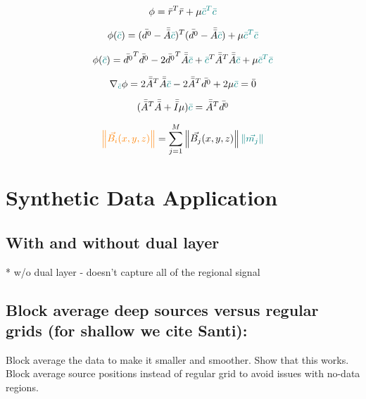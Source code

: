 \begin{equation}
    \phi = \bar{r}^T\bar{r} + \mu \textcolor{teal}{\bar{c}^T\bar{c}}
\end{equation}

\begin{equation}
    \phi (\textcolor{teal}{\bar{c}}) = (\bar{d^0} - \Bar{\Bar{A}} \textcolor{teal}{\Bar{c}})^T (\bar{d^0} - \Bar{\Bar{A}} \textcolor{teal}{\Bar{c}}) + \mu \textcolor{teal}{\bar{c}^T\bar{c}}
\end{equation}

\begin{equation}
    \phi (\textcolor{teal}{\bar{c}}) = \bar{d^0}^T\bar{d^0} - 2 \bar{d^0}^T \Bar{\Bar{A}} \textcolor{teal}{\Bar{c}} + \textcolor{teal}{\Bar{c}}^T \Bar{\Bar{A}}^T \Bar{\Bar{A}} \textcolor{teal}{\Bar{c}} + \mu \textcolor{teal}{\bar{c}^T\bar{c}}
\end{equation}

\begin{equation}
    \nabla_{\textcolor{teal}{\bar{c}}} \phi = 2 \Bar{\Bar{A}}^T \Bar{\Bar{A}} \textcolor{teal}{\Bar{c}} - 2\Bar{\Bar{A}}^T\bar{d^0} + 2\mu \textcolor{teal}{\bar{c}} = \bar{0}
\end{equation}
    
\begin{equation}
    (\Bar{\Bar{A}}^T \Bar{\Bar{A}} + \Bar{\Bar{I}} \mu ) \textcolor{teal}{\bar{c}} = 
    \Bar{\Bar{A}}^T\bar{d^0}
\end{equation}

\begin{equation}
  \textcolor{orange}{\left\lVert \vec{B_i}(x,y,z) \right\rVert} = \sum_{j=1}^{M} \left\lVert \vec{B_j}(x,y,z) \right\rVert \textcolor{teal}{\left\lVert \vec{m_j} \right\rVert}
\end{equation}


\section{Synthetic Data Application}

\subsection{With and without dual layer}
* w/o dual layer - doesn't capture all of the regional signal

\subsection{Block average deep sources versus regular grids (for shallow we cite Santi):}
Block average the data to make it smaller and smoother. Show that this works.
Block average source positions instead of regular grid to avoid issues with no-data regions.

